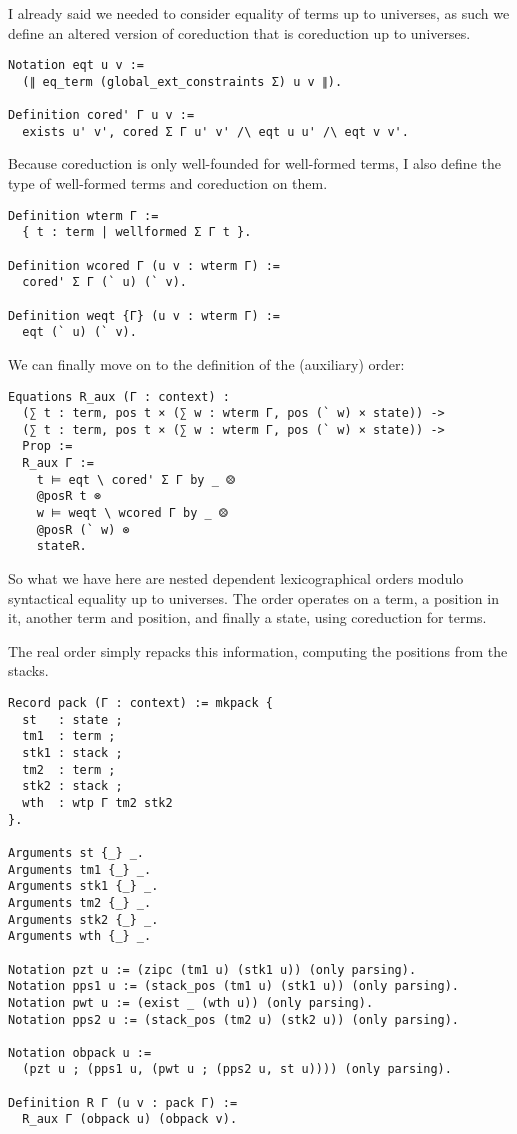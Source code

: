I already said we needed to consider equality of terms up to universes, as such
we define an altered version of coreduction that is coreduction up to universes.
\begin{verbatim}
Notation eqt u v :=
  (∥ eq_term (global_ext_constraints Σ) u v ∥).

Definition cored' Γ u v :=
  exists u' v', cored Σ Γ u' v' /\ eqt u u' /\ eqt v v'.
\end{verbatim}

Because coreduction is only well-founded for well-formed terms, I also define
the type of well-formed terms and coreduction on them.
\begin{verbatim}
Definition wterm Γ :=
  { t : term | wellformed Σ Γ t }.

Definition wcored Γ (u v : wterm Γ) :=
  cored' Σ Γ (` u) (` v).

Definition weqt {Γ} (u v : wterm Γ) :=
  eqt (` u) (` v).
\end{verbatim}

We can finally move on to the definition of the (auxiliary) order:
\begin{verbatim}
Equations R_aux (Γ : context) :
  (∑ t : term, pos t × (∑ w : wterm Γ, pos (` w) × state)) ->
  (∑ t : term, pos t × (∑ w : wterm Γ, pos (` w) × state)) ->
  Prop :=
  R_aux Γ :=
    t ⊨ eqt \ cored' Σ Γ by _ ⨷
    @posR t ⊗
    w ⊨ weqt \ wcored Γ by _ ⨷
    @posR (` w) ⊗
    stateR.
\end{verbatim}
So what we have here are nested dependent lexicographical orders modulo
syntactical equality up to universes.
The order operates on a term, a position in it, another term and position, and
finally a state, using coreduction for terms.

The real order simply repacks this information, computing the positions from
the stacks.
\begin{verbatim}
Record pack (Γ : context) := mkpack {
  st   : state ;
  tm1  : term ;
  stk1 : stack ;
  tm2  : term ;
  stk2 : stack ;
  wth  : wtp Γ tm2 stk2
}.

Arguments st {_} _.
Arguments tm1 {_} _.
Arguments stk1 {_} _.
Arguments tm2 {_} _.
Arguments stk2 {_} _.
Arguments wth {_} _.

Notation pzt u := (zipc (tm1 u) (stk1 u)) (only parsing).
Notation pps1 u := (stack_pos (tm1 u) (stk1 u)) (only parsing).
Notation pwt u := (exist _ (wth u)) (only parsing).
Notation pps2 u := (stack_pos (tm2 u) (stk2 u)) (only parsing).

Notation obpack u :=
  (pzt u ; (pps1 u, (pwt u ; (pps2 u, st u)))) (only parsing).

Definition R Γ (u v : pack Γ) :=
  R_aux Γ (obpack u) (obpack v).
\end{verbatim}

